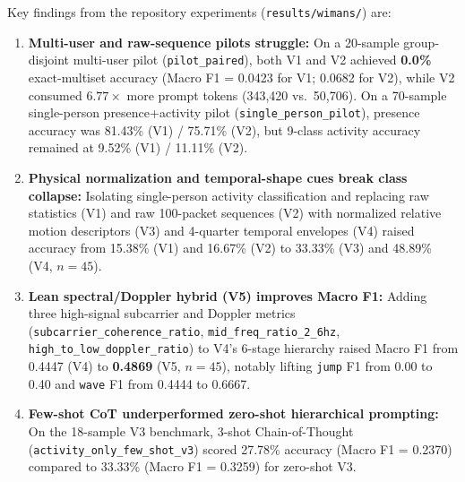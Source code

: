 \documentclass[11pt,a4paper]{article}
\begin{document}
Key findings from the repository experiments (\texttt{results/wimans/}) are:
\begin{enumerate}
    \item \textbf{Multi-user and raw-sequence pilots struggle:} On a 20-sample group-disjoint multi-user pilot (\texttt{pilot\_paired}), both V1 and V2 achieved \textbf{0.0\%} exact-multiset accuracy (Macro F1 = 0.0423 for V1; 0.0682 for V2), while V2 consumed $6.77\times$ more prompt tokens (343,420 vs.\ 50,706). On a 70-sample single-person presence+activity pilot (\texttt{single\_person\_pilot}), presence accuracy was 81.43\% (V1) / 75.71\% (V2), but 9-class activity accuracy remained at 9.52\% (V1) / 11.11\% (V2).
    \item \textbf{Physical normalization and temporal-shape cues break class collapse:} Isolating single-person activity classification and replacing raw statistics (V1) and raw 100-packet sequences (V2) with normalized relative motion descriptors (V3) and 4-quarter temporal envelopes (V4) raised accuracy from 15.38\% (V1) and 16.67\% (V2) to 33.33\% (V3) and 48.89\% (V4, $n=45$).
    \item \textbf{Lean spectral/Doppler hybrid (V5) improves Macro F1:} Adding three high-signal subcarrier and Doppler metrics (\texttt{subcarrier\_coherence\_ratio}, \texttt{mid\_freq\_ratio\_2\_6hz}, \texttt{high\_to\_low\_doppler\_ratio}) to V4's 6-stage hierarchy raised Macro F1 from 0.4447 (V4) to \textbf{0.4869} (V5, $n=45$), notably lifting \texttt{jump} F1 from 0.00 to 0.40 and \texttt{wave} F1 from 0.4444 to 0.6667.
    \item \textbf{Few-shot CoT underperformed zero-shot hierarchical prompting:} On the 18-sample V3 benchmark, 3-shot Chain-of-Thought (\texttt{activity\_only\_few\_shot\_v3}) scored 27.78\% accuracy (Macro F1 = 0.2370) compared to 33.33\% (Macro F1 = 0.3259) for zero-shot V3.
\end{enumerate}
\end{document}

